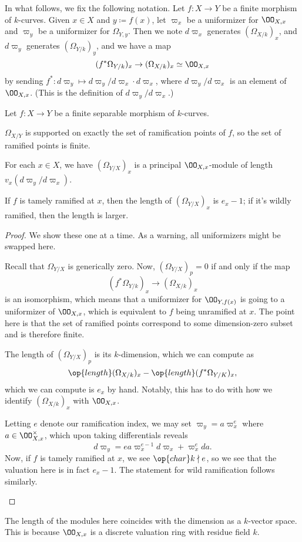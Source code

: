 \documentclass[../notes.tex]{subfiles}
\begin{document}
In what follows, we fix the following notation. Let $f\colon X\to Y$ be a finite morphism of $k$-curves. Given $x\in X$ and $y\coloneqq f(x)$, let $\varpi_x$ be a uniformizer for $\OO_{X,x}$ and $\varpi_y$ be a uniformizer for $\Omega_{Y,y}$. Then we note $d\varpi_x$ generates $(\Omega_{X/k})_x$, and $d\varpi_y$ generates $(\Omega_{Y/k})_y$, and we have a map
\[(f^*\Omega_{Y/k})_x\to(\Omega_{X/k})_x\simeq\OO_{X,x}\]
by sending $f^*\colon d\varpi_y\mapsto d\varpi_y/d\varpi_x\cdot d\varpi_x$, where $d\varpi_y/d\varpi_x$ is an element of $\OO_{X,x}$. (This is the definition of $d\varpi_y/d\varpi_x$.)
\begin{proposition}
	Let $f\colon X\to Y$ be a finite separable morphism of $k$-curves.
	\begin{listalph}
		\item $\Omega_{X/Y}$ is supported on exactly the set of ramification points of $f$, so the set of ramified points is finite.
		\item For each $x\in X$, we have $(\Omega_{Y/X})_x$ is a principal $\OO_{X,x}$-module of length $v_x(d\varpi_y/d\varpi_x)$.
		\item If $f$ is tamely ramified at $x$, then the length of $(\Omega_{Y/X})_x$ is $e_x-1$; if it's wildly ramified, then the length is larger.
	\end{listalph}
\end{proposition}
\begin{proof}
	We show these one at a time. As a warning, all uniformizers might be swapped here.
	\begin{listalph}
		\item Recall that $\Omega_{Y/X}$ is generically zero. Now, $(\Omega_{Y/X})_p=0$ if and only if the map
		\[(f^*\Omega_{Y/k})_x\to(\Omega_{X/k})_x\]
		is an isomorphism, which means that a uniformizer for $\OO_{Y,f(x)}$ is going to a uniformizer of $\OO_{X,x}$, which is equivalent to $f$ being unramified at $x$. The point here is that the set of ramified points correspond to some dimension-zero subset and is therefore finite.
		\item The length of $(\Omega_{Y/X})_p$ is its $k$-dimension, which we can compute as
		\[\op{length}(\Omega_{X/k})_x-\op{length}(f^*\Omega_{Y/K})_x,\]
		which we can compute is $e_x$ by hand. Notably, this has to do with how we identify $(\Omega_{X/k})_x$ with $\OO_{X,x}$.
		\item Letting $e$ denote our ramification index, we may set $\varpi_y=a\varpi_x^e$ where $a\in\OO_{X,x}^\times$, which upon taking differentials reveals
		\[d\varpi_y=ea\varpi_x^{e-1}d\varpi_x+\varpi_x^eda.\]
		Now, if $f$ is tamely ramified at $x$, we see $\op{char}k\nmid e$, so we see that the valuation here is in fact $e_x-1$. The statement for wild ramification follows similarly.
		\qedhere
	\end{listalph}
\end{proof}
\begin{remark}
	The length of the modules here coincides with the dimension as a $k$-vector space. This is because $\OO_{X,x}$ is a discrete valuation ring with residue field $k$.
\end{remark}
\end{document}
